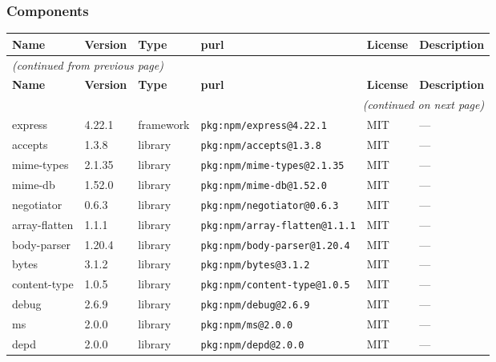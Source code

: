 \documentclass[11pt,a4paper]{article}
\begin{document}
\subsubsection*{Components}
\begin{longtable}{|p{4cm}|p{2cm}|p{1.6cm}|p{5cm}|p{1.5cm}|p{3.5cm}|}
\toprule
\rowcolor{sbomhdr}\textbf{Name} & \textbf{Version} & \textbf{Type} & \textbf{purl} & \textbf{License} & \textbf{Description} \\
\midrule
\endfirsthead
\multicolumn{6}{l}{\small\itshape (continued from previous page)} \\
\toprule
\rowcolor{sbomhdr}\textbf{Name} & \textbf{Version} & \textbf{Type} & \textbf{purl} & \textbf{License} & \textbf{Description} \\
\midrule
\endhead
\midrule
\multicolumn{6}{r}{\small\itshape (continued on next page)} \\
\endfoot
\bottomrule
\endlastfoot
\raggedright express & 4.22.1 & framework & \small\texttt{pkg:npm/express@4.22.1} & MIT & \small — \\
\raggedright accepts & 1.3.8 & library & \small\texttt{pkg:npm/accepts@1.3.8} & MIT & \small — \\
\raggedright mime-types & 2.1.35 & library & \small\texttt{pkg:npm/mime-types@2.1.35} & MIT & \small — \\
\raggedright mime-db & 1.52.0 & library & \small\texttt{pkg:npm/mime-db@1.52.0} & MIT & \small — \\
\raggedright negotiator & 0.6.3 & library & \small\texttt{pkg:npm/negotiator@0.6.3} & MIT & \small — \\
\raggedright array-flatten & 1.1.1 & library & \small\texttt{pkg:npm/array-flatten@1.1.1} & MIT & \small — \\
\raggedright body-parser & 1.20.4 & library & \small\texttt{pkg:npm/body-parser@1.20.4} & MIT & \small — \\
\raggedright bytes & 3.1.2 & library & \small\texttt{pkg:npm/bytes@3.1.2} & MIT & \small — \\
\raggedright content-type & 1.0.5 & library & \small\texttt{pkg:npm/content-type@1.0.5} & MIT & \small — \\
\raggedright debug & 2.6.9 & library & \small\texttt{pkg:npm/debug@2.6.9} & MIT & \small — \\
\raggedright ms & 2.0.0 & library & \small\texttt{pkg:npm/ms@2.0.0} & MIT & \small — \\
\raggedright depd & 2.0.0 & library & \small\texttt{pkg:npm/depd@2.0.0} & MIT & \small — \\

\end{longtable}
\end{document}
